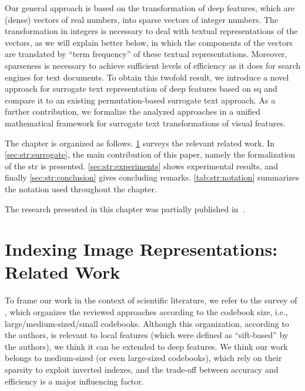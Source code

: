 Our general approach is based on the transformation of deep features, which are (dense) vectors of real numbers, into sparse vectors of integer numbers.
The transformation in integers is necessary to deal with textual representations of the vectors, as we will explain better below, in which the components of the vectors are translated by ``term frequency'' of these textual representations.
Moreover, sparseness is necessary to achieve sufficient levels of efficiency as it does for search engines for text documents.
To obtain this twofold result, we introduce a novel approach for surrogate text representation of deep features based on \acrfull{sq} and compare it to an existing permutation-based surrogate text approach.
As a further contribution, we formalize the analyzed approaches in a unified mathematical framework for surrogate text transformations of visual features.


The chapter is organized as follows.
\ref{sec:str:related-work} surveys the relevant related work.
In \ref{sec:str:surrogate}, the main contribution of this paper, namely the formalization of the \acrfull{str} is presented.
\ref{sec:str:experiments} shows experimental results, and finally \ref{sec:str:conclusion} gives concluding remarks.
\ref{tab:str:notation} summarizes the notation used throughout the chapter.

The research presented in this chapter was partially published in~\cite{amato2017efficient,amato2018large}.

\section{Indexing Image Representations: Related Work}
\label{sec:str:related-work}
To frame our work in the context of scientific literature, we refer to the survey of \citet{zheng2018sift}, which organizes the reviewed approaches according to the codebook size, i.e., large/medium-sized/small codebooks.
Although this organization, according to the authors, is relevant to local features (which were defined as ``sift-based'' by the authors), we think it can be extended to deep features.
We think our work belongs to medium-sized (or even large-sized codebooks), which rely on their sparsity to exploit inverted indexes, and the trade-off between accuracy and efficiency is a major influencing factor.

